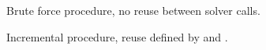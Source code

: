\begin{figure}[h]
  \begin{subfigure}[t]{.45\textwidth}
    
    \vspace{1.2em}
    \caption{Brute force procedure, no reuse between solver calls.}%
    \label{fig:bkg:bf}
  \end{subfigure}%
  \hfill
  \begin{subfigure}[t]{.45\textwidth}
    
    \caption{Incremental procedure, reuse defined by  and .}%
    \label{fig:bkg:inc}
  \end{subfigure}
  \caption{}%
  \label{fig:bkg}
\end{figure}